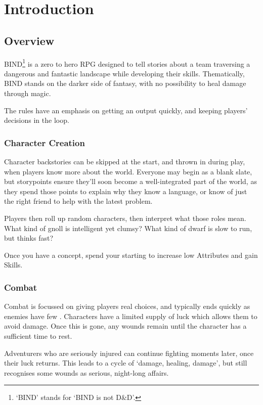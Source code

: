 \chapter*{Introduction}

\section*{Overview}

\begin{multicols}{2}

\noindent
BIND\footnote{`BIND' stands for `BIND is not D\&D'.} is a zero to hero RPG designed to tell stories about a team traversing a dangerous and fantastic landscape while developing their skills.
Thematically, BIND stands on the darker side of fantasy, with no possibility to heal damage through magic.

The rules have an emphasis on getting an output quickly, and keeping players' decisions in the loop.

\subsection*{Character Creation}

Character backstories can be skipped at the start, and thrown in during play, when players know more about the world.
Everyone may begin as a blank slate, but \glspl{storypoint} ensure they'll soon become a well-integrated part of the world, as they spend those points to explain why they know a language, or know of just the right friend to help with the latest problem.

Players then roll up random characters, then interpret what those roles mean.
What kind of gnoll is intelligent yet clumsy?
What kind of dwarf is slow to run, but thinks fast?

Once you have a concept, spend your starting  to increase low Attributes and gain Skills.

\subsection*{Combat}

Combat is focussed on giving players real choices, and typically ends quickly as enemies have few .
Characters have a limited supply of luck which allows them to avoid damage.
Once this is gone, any wounds remain until the character has a sufficient time to rest.

Adventurers who are seriously injured can continue fighting moments later, once their luck returns.
This leads to a cycle of `damage, healing, damage', but still recognises some wounds as serious, night-long affairs.


\end{multicols}
